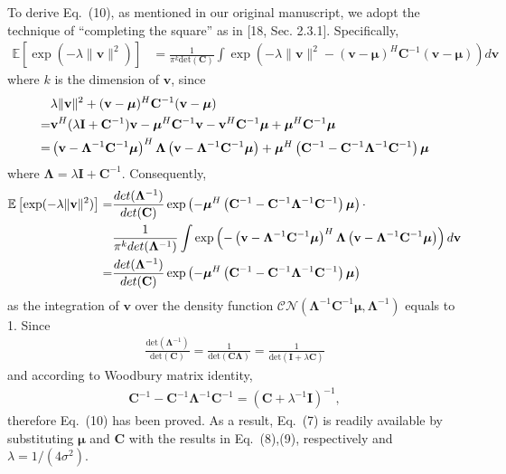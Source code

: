 \documentclass[onecolumn, 11pt, draftclsnofoot]{IEEEtran}
\begin{document}
To derive Eq.~(10), as mentioned in our original manuscript, we adopt the
technique of ``completing the square'' as in [18, Sec. 2.3.1]. Specifically,
\begin{align}
  \mathbb{E}\left[\exp(-\lambda\|\mathbf{v}\|^2)\right] & =
  \frac{1}{\pi^k\mbox{det}(\mathbf{C})}\int \exp\left(-\lambda\|\mathbf{v}\|^2 -
  (\mathbf{v} -
  \bm{\mu})^H\mathbf{C}^{-1} (\mathbf{v} - \bm{\mu})\right)d\mathbf{v}
\end{align}
where $k$ is the dimension of $\mathbf{v}$, since
\begin{align}
  & \lambda\|\mathbf{v}\|^2 + (\mathbf{v} - \bm{\mu})^H\mathbf{C}^{-1}
  (\mathbf{v} - \bm{\mu}) \notag \\
  =& \mathbf{v}^H
  (\lambda\mathbf{I} + \mathbf{C}^{-1})\mathbf{v} -
  \bm{\mu}^H\mathbf{C}^{-1}\mathbf{v} - \mathbf{v}^H\mathbf{C}^{-1}\bm{\mu} +
  \bm{\mu}^H\mathbf{C}^{-1}\bm{\mu} \notag\\
  =& \left(\mathbf{v} - \mathbf{\Lambda}^{-1}\mathbf{C}^{-1}\bm{\mu}\right)^H
  \mathbf{\Lambda} \left(\mathbf{v} -
  \mathbf{\Lambda}^{-1}\mathbf{C}^{-1}\bm{\mu}\right) +
  \bm{\mu}^H\left(\mathbf{C}^{-1} - \mathbf{C}^{-1} \mathbf{\Lambda}^{-1}
  \mathbf{C}^{-1} \right) \bm{\mu}
\end{align}
where $\mathbf{\Lambda} = \lambda\mathbf{I} + \mathbf{C}^{-1}$. Consequently,
\begin{align}
  \mathbb{E}\left[\exp(-\lambda\|\mathbf{v}\|^2)\right] = &
  \frac{\relax{det}(\mathbf{\Lambda}^{-1})}{\relax{det}(\mathbf{C})}
  \exp\left(-\bm{\mu}^H\left(\mathbf{C}^{-1} - \mathbf{C}^{-1} \mathbf{\Lambda}^{-1}
  \mathbf{C}^{-1} \right) \bm{\mu} \right) \cdot
  \notag \\
  & \frac{1}{\pi^k\relax{det}(\mathbf{\Lambda}^{-1})} \int
  \exp\left(-\left(\mathbf{v} -
  \mathbf{\Lambda}^{-1}\mathbf{C}^{-1}\bm{\mu}\right)^H \mathbf{\Lambda}
  \left(\mathbf{v} - \mathbf{\Lambda}^{-1}\mathbf{C}^{-1}\bm{\mu}\right) \right)
  d\mathbf{v} \notag \\
  = & \frac{\relax{det}(\mathbf{\Lambda}^{-1})}{\relax{det}(\mathbf{C})}
  \exp\left(-\bm{\mu}^H\left(\mathbf{C}^{-1} - \mathbf{C}^{-1} \mathbf{\Lambda}^{-1}
  \mathbf{C}^{-1} \right) \bm{\mu} \right) 
\end{align}
as the integration of $\mathbf{v}$ over the density function
$\mathcal{CN}(\mathbf{\Lambda}^{-1}\mathbf{C}^{-1}\bm{\mu},
\mathbf{\Lambda}^{-1})$ equals to 1. Since 
\begin{align}
  \frac{\mbox{det}(\mathbf{\Lambda}^{-1})}{\mbox{det}(\mathbf{C})} =
  \frac{1}{\mbox{det}(\mathbf{C\Lambda})} =
  \frac{1}{\mbox{det}(\mathbf{I} + \lambda \mathbf{C})}
\end{align}
and according to Woodbury matrix identity,
\begin{align}
  \mathbf{C}^{-1} - \mathbf{C}^{-1} \mathbf{\Lambda}^{-1}
  \mathbf{C}^{-1} = \left(\mathbf{C} + \lambda^{-1}\mathbf{I}\right)^{-1},
\end{align}
therefore Eq.~(10) has been proved. As a result, Eq.~(7) is readily available by
substituting $\bm{\mu}$ and $\mathbf{C}$ with the results in Eq.~(8),(9),
respectively and $\lambda=1/(4\sigma^2)$.
\end{document}
